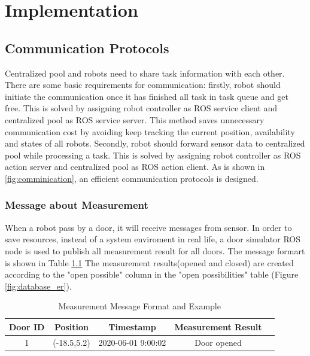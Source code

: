 \chapter{Implementation}


\section{Communication Protocols}


Centralized pool and robots need to share task information with each other. There are some basic requirements for communication: firstly,
robot should initiate the communication once it has finished all task in task queue and get free. This is solved by assigning robot controller as ROS service client and centralized pool as ROS service server.
This method saves unnecessary communication cost by avoiding keep tracking the current position, availability and states of all robots.
Secondly, robot should forward sensor data to centralized pool while processing a task. This is solved by assigning robot controller as ROS action server and centralized pool as ROS action client.
As is shown in \ref{fig:comminication}, an efficient communication protocols is designed. 

\subsection{Message about Measurement}
\label{sec:measurement_message}
When a robot pass by a door, it will receive messages from sensor. 
In order to save resources, instead of a system enviroment in real life, a door simulator ROS node is used to publish all measurement result for all doors. The message formart is shown in Table \ref{tab:sensor_message} 
The measurement results(opened and closed) are created according to the "open possible" column in the "open possibilities" table (Figure \ref{fig:database_er}).

\begin{table}[htb]
\centering
\begin{tabular}{|c|c|c|c|c|} 
\hline
Door ID  & Position& Timestamp & Measurement Result \\
\hline\hline
1&(-18.5,5.2) & 2020-06-01 9:00:02 & Door opened \\ [1ex] 
\hline
\end{tabular}
\caption{Measurement Message Format and Example}
\label{tab:sensor_message}
\end{table}
	

